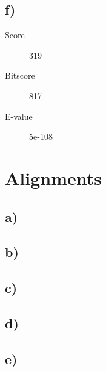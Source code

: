 \documentclass[a4paper,12pt,twoside,openright]{article}
\begin{document}
\subsection*{f)}
\begin{description}
\item[Score] 319
\item[Bitscore] 817
\item[E-value] 5e-108
\end{description}

\section{Alignments}
\subsection*{a)}
\subsection*{b)}
\subsection*{c)}
\subsection*{d)}
\subsection*{e)}
\end{document}
